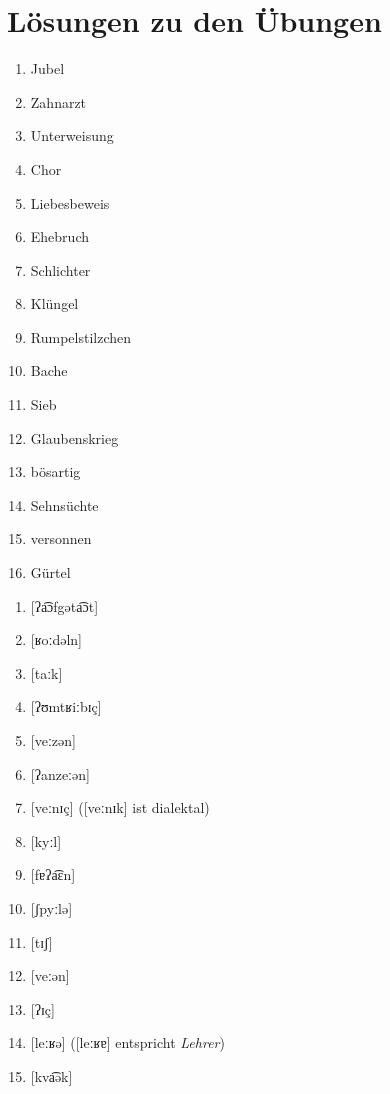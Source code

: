 {}
\chapter*{Lösungen zu den Übungen}
\label{sec:loesungenzudenuebungen}


\label{sol:phonetik01}

\begin{enumerate}
  \item Jubel
  \item Zahnarzt
  \item Unterweisung
  \item Chor
  \item Liebesbeweis
  \item Ehebruch
  \item Schlichter
  \item Klüngel
  \item Rumpelstilzchen
  \item Bache
  \item Sieb
  \item Glaubenskrieg
  \item bösartig
  \item Sehnsüchte
  \item versonnen
  \item Gürtel
\end{enumerate}

\Enl[1]

\label{sol:phonetik02}

\begin{enumerate}
  \item{[ʔa͡ɔfgəta͡ɔt]}
  \item{[ʁoːdəln]}
  \item{[taːk]}
  \item{[ʔʊmtʁiːbɪç]}
  \item{[veːzən]}
  \item{[ʔanzeːən]}
  \item{[veːnɪç] ([veːnɪk] ist dialektal)}
  \item{[kyːl]}
  \item{[fɐʔa͡ɛn]}
  \item{[ʃpyːlə]}
  \item{[tɪʃ]}
  \item{[veːən]}
  \item{[ʔɪç]}
  \item{[leːʁə] ([leːʁɐ] entspricht \textit{Lehrer})}
  \item{[kva͡ək]}
\end{enumerate}

